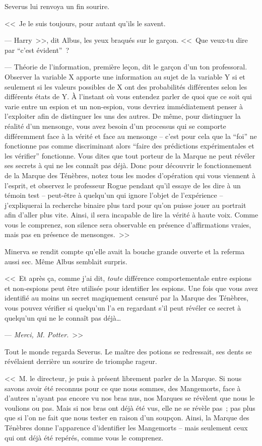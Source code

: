 Severus lui renvoya un fin sourire.

<<~Je le suis toujours, pour autant qu'ils le savent.

--- Harry~>>, dit Albus, les yeux braqués sur le garçon. <<~Que veux-tu dire par “c'est évident”~?

--- Théorie de l'information, première leçon, dit le garçon d'un ton professoral. Observer la variable X apporte une information au sujet de la variable Y si et seulement si les valeurs possibles de X ont des probabilités différentes selon les différents états de Y. À l'instant où vous entendez parler de quoi que ce soit qui varie entre un espion et un non-espion, vous devriez immédiatement penser à l'exploiter afin de distinguer les uns des autres. De même, pour distinguer la réalité d'un mensonge, vous avez besoin d'un processus qui se comporte différemment face à la vérité et face au mensonge -- c'est pour cela que la “foi” ne fonctionne pas comme discriminant alors “faire des prédictions expérimentales et les vérifier” fonctionne. Vous dites que tout porteur de la Marque ne peut révéler ses secrets à qui ne les connaît pas déjà. Donc pour découvrir le fonctionnement de la Marque des Ténèbres, notez tous les modes d'opération qui vous viennent à l'esprit, et observez le professeur Rogue pendant qu'il essaye de les dire à un témoin test -- peut-être à quelqu'un qui ignore l'objet de l'expérience -- j'expliquerai la recherche binaire plus tard pour qu'on puisse jouer au portrait afin d'aller plus vite. Ainsi, il sera incapable de lire la vérité à haute voix. Comme vous le comprenez, son silence sera observable en présence d'affirmations vraies, mais pas en présence de mensonges.~>>

Minerva se rendit compte qu'elle avait la bouche grande ouverte et la referma aussi sec. Même Albus semblait surpris.

<<~Et après ça, comme j'ai dit, \emph{toute} différence comportementale entre espions et non-espions peut être utilisée pour identifier les espions. Une fois que vous avez identifié au moins un secret magiquement censuré par la Marque des Ténèbres, vous pouvez vérifier si quelqu'un l'a en regardant s'il peut révéler ce secret à quelqu'un qui ne le connaît pas déjà…

--- \emph{Merci, M. Potter.}~>>

Tout le monde regarda Severus. Le maître des potions se redressait, ses dents se révélaient derrière un sourire de triomphe rageur.

<<~M. le directeur, je puis à présent librement parler de la Marque. Si nous savons avoir été reconnus pour ce que nous sommes, des Mangemorts, face à d'autres n'ayant pas encore vu nos bras nus, nos Marques se révèlent que nous le voulions ou pas. Mais si nos bras ont déjà été vus, elle ne se révèle pas~; pas plus que si l'on ne fait que nous tester en raison d'un soupçon. Ainsi, la Marque des Ténèbres donne l'apparence d'identifier les Mangemorts -- mais seulement ceux qui ont déjà été repérés, comme vous le comprenez.

